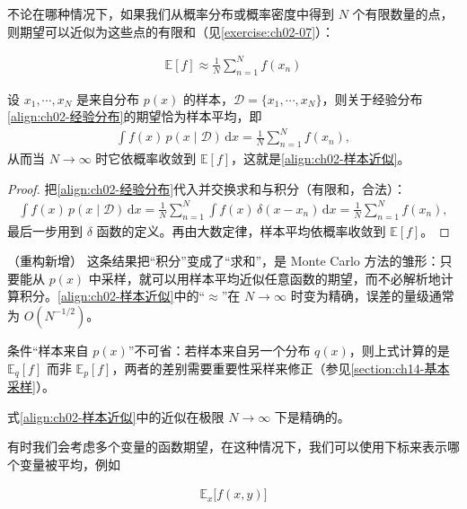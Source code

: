 \documentclass[../../main.tex]{subfiles}
\begin{document}
不论在哪种情况下，如果我们从概率分布或概率密度中得到 $N$ 个有限数量的点，则期望可以近似为这些点的有限和（见\cref{exercise:ch02-07}）：

\begin{align}
  \mathbb{E}[f] \approx \frac{1}{N}\sum_{n=1}^{N} f(x_n)
  \label{align:ch02-样本近似}
\end{align}

\begin{proposition}[期望的样本近似]\label{proposition:ch02-期望的样本近似}
设 $x_1,\cdots,x_N$ 是来自分布 $p(x)$ 的样本，$\mathcal{D}=\{x_1,\cdots,x_N\}$，则关于经验分布\eqref{align:ch02-经验分布}的期望恰为样本平均，即
\begin{align*}
  \int f(x)\,p(x\mid\mathcal{D})\,\mathrm{d}x = \frac{1}{N}\sum_{n=1}^{N} f(x_n) ,
\end{align*}
从而当 $N\to\infty$ 时它依概率收敛到 $\mathbb{E}[f]$，这就是\eqref{align:ch02-样本近似}。
\end{proposition}

\begin{proof}
把\eqref{align:ch02-经验分布}代入并交换求和与积分（有限和，合法）：
\begin{align*}
  \int f(x)\,p(x\mid\mathcal{D})\,\mathrm{d}x
  = \frac{1}{N}\sum_{n=1}^{N}\int f(x)\,\delta(x-x_n)\,\mathrm{d}x
  = \frac{1}{N}\sum_{n=1}^{N} f(x_n) ,
\end{align*}
最后一步用到 $\delta$ 函数的定义。再由大数定律，样本平均依概率收敛到 $\mathbb{E}[f]$。
\end{proof}

\begin{remark}（重构新增）
这条结果把“积分”变成了“求和”，是 Monte Carlo 方法的雏形：只要能从 $p(x)$ 中采样，就可以用样本平均近似任意函数的期望，而不必解析地计算积分。\eqref{align:ch02-样本近似}中的“$\approx$”在 $N\to\infty$ 时变为精确，误差的量级通常为 $O(N^{-1/2})$。

条件“样本来自 $p(x)$”不可省：若样本来自另一个分布 $q(x)$，则上式计算的是 $\mathbb{E}_q[f]$ 而非 $\mathbb{E}_p[f]$，两者的差别需要重要性采样来修正（参见\cref{section:ch14-基本采样}）。
\end{remark}

式\eqref{align:ch02-样本近似}中的近似在极限 $N\to\infty$ 下是精确的。

有时我们会考虑多个变量的函数期望，在这种情况下，我们可以使用下标来表示哪个变量被平均，例如

\begin{align}
  \mathbb{E}_{x}\big[f(x,y)\big]
  \label{align:ch02-偏期望}
\end{align}
\end{document}
